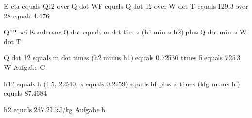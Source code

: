 E eta equals Q12 over Q dot WF equals Q dot 12 over W dot T equals 129.3 over 28 equals 4.476

Q12 bei Kondensor
Q dot equals m dot times (h1 minus h2) plus Q dot minus W dot T

Q dot 12 equals m dot times (h2 minus h1) equals 0.72536 times 5 equals 725.3 W Aufgabe C

h12 equals h (1.5, 22540, x equals 0.2259) equals hf plus x times (hfg minus hf) equals 87.4684

h2 equals 237.29 kJ/kg Aufgabe b